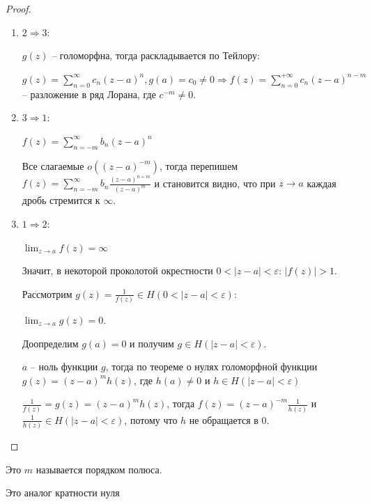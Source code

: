 \begin{proof}
    \begin{enumerate}
        \item {
            $2 \Rightarrow 3$:
            
            $g(z)$ -- голоморфна, тогда раскладывается по Тейлору:
            
            $g(z) = \sum_{n=0}^{\infty} c_n (z - a)^n, g(a) = c_0 \neq 0 \Rightarrow f(z) = \sum_{n = 0}^{+\infty} c_n(z - a)^{n - m}$ -- разложение в ряд Лорана, где $c^{-m} \neq 0$.
        }
        \item {
            $3 \Rightarrow 1$:
            
            $f(z) = \sum_{n = -m}^{\infty} b_n(z - a)^n$
            
            Все слагаемые $o((z - a)^{-m})$, тогда перепишем $f(z) = \sum_{n=-m}^{\infty} b_n \frac{(z-a)^{n + m}}{(z - a)^{m}}$ и становится видно, что при $z \rightarrow a$ каждая дробь стремится к $\infty$.
            
        } 
        \item {
            $1 \Rightarrow 2$:
            
            $\lim_{z \to a} f(z) = \infty$
            
            Значит, в некоторой проколотой окрестности $0 <|z - a| < \varepsilon$:
            $|f(z)| > 1$.
            
            Рассмотрим $g(z) = \frac{1}{f(z)} \in H(0 < |z - a| < \varepsilon)$:
            
            $\lim_{z \to a} g(z) = 0$.
            
            Доопределим $g(a) = 0$ и получим $g \in H(|z - a| < \varepsilon)$.
            
            $a$ -- ноль функции $g$, тогда по теореме о нулях голоморфной функции $g(z) = (z - a)^m h(z)$, где $h(a) \neq 0$ и $h \in H(|z - a| < \varepsilon)$

            $\frac{1}{f(z)} = g(z) = (z - a)^m h(z)$, тогда $f(z) = (z - a)^{-m} \frac{1}{h(z)}$ и $\frac{1}{h(z)} \in H(|z - a| < \varepsilon)$, потому что $h$ не обращается в $0$. 
        }
    \end{enumerate}
\end{proof}

\begin{definition}
    Это $m$ называется порядком полюса.
    \begin{remark}
        Это аналог кратности нуля
    \end{remark}
\end{definition}


